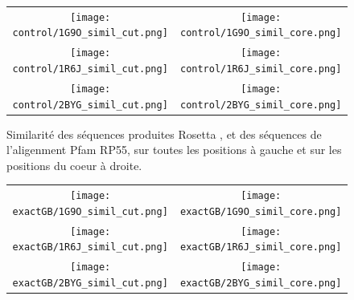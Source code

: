        \clearpage
    \thispagestyle{empty}
   \begin{figure}[t]
     \centering
     \begin{tabular}{cc} 
       \texttt{[image: control/1G9O\_simil\_cut.png]} &
       \texttt{[image: control/1G9O\_simil\_core.png]} \\
       \texttt{[image: control/1R6J\_simil\_cut.png]} &
       \texttt{[image: control/1R6J\_simil\_core.png]} \\
       \texttt{[image: control/2BYG\_simil\_cut.png]} &
       \texttt{[image: control/2BYG\_simil\_core.png]} \\
     \end{tabular}
     \caption{Similarité des séquences produites Rosetta , et des séquences de l'aligenment Pfam RP55, sur toutes les positions à gauche  et sur les positions du coeur à droite.}

\label{graph:Simil_control}


   \end{figure}



       \clearpage
    \thispagestyle{empty}
   \begin{figure}[t]
     \centering
     \begin{tabular}{cc} 
       \texttt{[image: exactGB/1G9O\_simil\_cut.png]} &
       \texttt{[image: exactGB/1G9O\_simil\_core.png]} \\
       \texttt{[image: exactGB/1R6J\_simil\_cut.png]} &
       \texttt{[image: exactGB/1R6J\_simil\_core.png]} \\
       \texttt{[image: exactGB/2BYG\_simil\_cut.png]} &
       \texttt{[image: exactGB/2BYG\_simil\_core.png]} \\
     \end{tabular}

\label{graph:Simil_control_B}


   \end{figure}


   \clearpage
   
